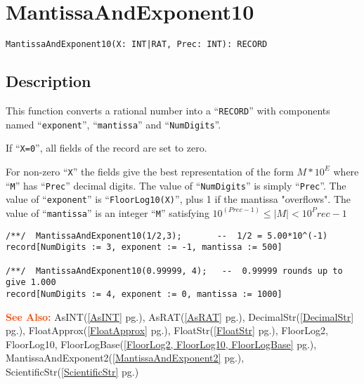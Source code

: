 \documentclass[a4paper]{mybook}
\newenvironment{command}{}{} %
\newcommand\SeeAlso{\par\textcolor{OrangeRed}{\textbf{\large See Also: }}}
\begin{document}
\section{MantissaAndExponent10}
\label{MantissaAndExponent10}
\begin{command} %


\begin{Verbatim}[label=syntax, rulecolor=\color{MidnightBlue},
frame=single]
MantissaAndExponent10(X: INT|RAT, Prec: INT): RECORD
\end{Verbatim}


\subsection*{Description}

This function converts a rational number into a ``\verb&RECORD&'' with components
named ``\verb&exponent&'', ``\verb&mantissa&'' and ``\verb&NumDigits&''.
\par 
If ``\verb&X=0&'', all fields of the record are set to zero.
\par 
For non-zero ``\verb&X&'' the fields give the best representation of the form $M*10^E$
where ``\verb&M&'' has ``\verb&Prec&'' decimal digits.
The value of ``\verb&NumDigits&'' is simply ``\verb&Prec&''.
The value of ``\verb&exponent&'' is ``\verb&FloorLog10(X)&'', plus 1 if the mantissa "overflows".
The value of ``\verb&mantissa&'' is an integer ``\verb&M&'' satisfying $10^(Prec-1) \le  |M| < 10^Prec-1$
\begin{Verbatim}[label=example, rulecolor=\color{PineGreen}, frame=single]
/**/  MantissaAndExponent10(1/2,3);       --  1/2 = 5.00*10^(-1)
record[NumDigits := 3, exponent := -1, mantissa := 500]

/**/  MantissaAndExponent10(0.99999, 4);   --  0.99999 rounds up to give 1.000
record[NumDigits := 4, exponent := 0, mantissa := 1000]
\end{Verbatim}


\SeeAlso %
  AsINT(\ref{AsINT} pg.\pageref{AsINT}), 
    AsRAT(\ref{AsRAT} pg.\pageref{AsRAT}), 
    DecimalStr(\ref{DecimalStr} pg.\pageref{DecimalStr}), 
    FloatApprox(\ref{FloatApprox} pg.\pageref{FloatApprox}), 
    FloatStr(\ref{FloatStr} pg.\pageref{FloatStr}), 
    FloorLog2, FloorLog10, FloorLogBase(\ref{FloorLog2, FloorLog10, FloorLogBase} pg.\pageref{FloorLog2, FloorLog10, FloorLogBase}), 
    MantissaAndExponent2(\ref{MantissaAndExponent2} pg.\pageref{MantissaAndExponent2}), 
    ScientificStr(\ref{ScientificStr} pg.\pageref{ScientificStr})
\end{command} %
\end{document}
